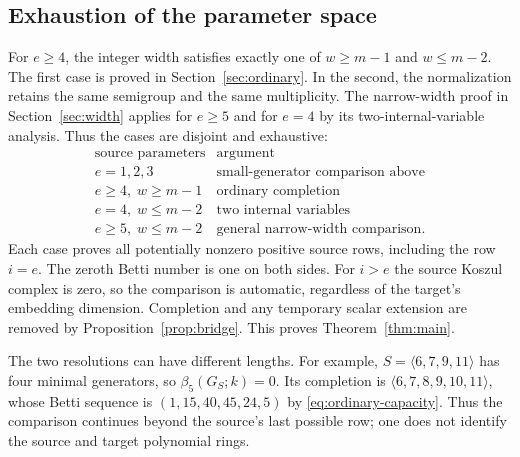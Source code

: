 \subsection{Exhaustion of the parameter space}
For $e\ge4$, the integer width satisfies exactly one of
$w\ge m-1$ and $w\le m-2$. The first case is proved in
Section~\ref{sec:ordinary}. In the second, the normalization retains
the same semigroup and the same multiplicity. The narrow-width proof
in Section~\ref{sec:width} applies for $e\ge5$ and for $e=4$ by
its two-internal-variable analysis. Thus the cases are disjoint and
exhaustive:
\[
\begin{array}{c|l}
\text{source parameters}&\text{argument}\\\hline
e=1,2,3&\text{small-generator comparison above}\\
e\ge4,\;w\ge m-1&\text{ordinary completion}\\
e=4,\;w\le m-2&\text{two internal variables}\\
e\ge5,\;w\le m-2&\text{general narrow-width comparison}.
\end{array}
\]
Each case proves all potentially nonzero positive source rows, including
the row $i=e$. The zeroth Betti number is one on both sides. For $i>e$
the source Koszul complex is zero, so the comparison is automatic,
regardless of the target's embedding dimension. Completion and any
temporary scalar extension are removed by Proposition~\ref{prop:bridge}.
This proves Theorem~\ref{thm:main}.

\begin{remark}
The two resolutions can have different lengths. For example,
$S=\langle6,7,9,11\rangle$ has four minimal generators, so
$\beta_5(G_S;k)=0$. Its completion is $\langle6,7,8,9,10,11\rangle$,
whose Betti sequence is
$(1,15,40,45,24,5)$ by \eqref{eq:ordinary-capacity}.
Thus the comparison continues beyond the source's last possible row;
one does not identify the source and target polynomial rings.
\end{remark}
